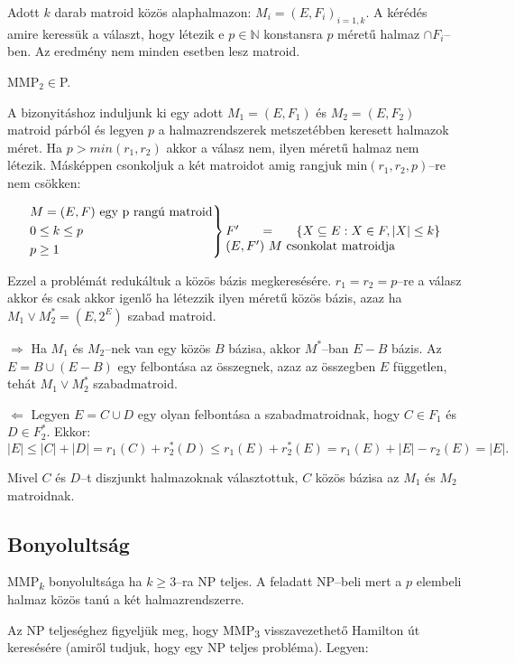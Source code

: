 Adott $k$ darab matroid közös alaphalmazon: $M_i=(E,F_i)_{i=1,k}$. A kérédés
amire keressük a választ, hogy létezik e $p \in \mathbb{N}$ konstansra $p$
méretű halmaz $\cap F_i$--ben. Az eredmény nem minden esetben lesz matroid.

\vspace{0.4cm}
MMP$_2 \in $P.
\vspace{0.4cm}

A bizonyitáshoz induljunk ki egy adott $M_1=(E,F_1)$ és $M_2=(E,F_2)$ matroid
párból és legyen $p$ a halmazrendszerek metszetébben keresett halmazok méret.
Ha $p>min(r_1, r_2)$ akkor a válasz nem, ilyen méretű halmaz nem létezik.
Másképpen csonkoljuk a két matroidot amig rangjuk min$(r_1,r_2, p)$--re nem
csökken:

\[ \begin{rcases}
M=(E,F) \mbox{ egy p rangú matroid} \\
0 \leq k \leq p \\ 
p \geq 1 
\end{rcases} \parbox[t]{6cm}
{$F' = \left\{ X \subseteq E: X \in F, |X| \leq k \right\}$ 
$(E,F')~M$ csonkolat matroidja} \]

Ezzel a problémát redukáltuk a közös bázis megkeresésére. $r_1=r_2=p$--re a
válasz akkor és csak akkor igenlő ha létezzik ilyen méretű közös bázis, azaz ha
$M_1 \vee M_2^*=(E,2^E)$ szabad matroid.

$\Rightarrow$ Ha $M_1$ és $M_2$--nek van egy közös $B$ bázisa, akkor $M^*$--ban
$E-B$ bázis. Az $E=B \cup (E-B)$ egy felbontása az összegnek, azaz az összegben
$E$ független, tehát $M_1 \vee M_2^*$ szabadmatroid.

$\Leftarrow$ Legyen $E=C \cup D$ egy olyan felbontása a szabadmatroidnak, hogy
$C \in F_1$ és $D \in F_2^*$. Ekkor:
\[|E| \leq |C| + |D| = r_1(C) + r_2^*(D) \leq r_1(E)+r_2^*(E) = r_1(E) + |E| - r_2(E)=|E|. \]

Mivel $C$ és $D$--t diszjunkt halmazoknak választottuk, $C$ közös bázisa az $M_1$ és
$M_2$ matroidnak.

\subsection{Bonyolultság}

MMP\textsubscript{$k$} bonyolultsága ha $k \geq 3$--ra NP teljes. A feladatt
NP--beli mert a $p$ elembeli halmaz közös tanú a két halmazrendszerre.

Az NP teljeséghez figyeljük meg, hogy MMP\textsubscript{$3$} visszavezethető
Hamilton út keresésére (amiről tudjuk, hogy egy NP teljes probléma). Legyen:

